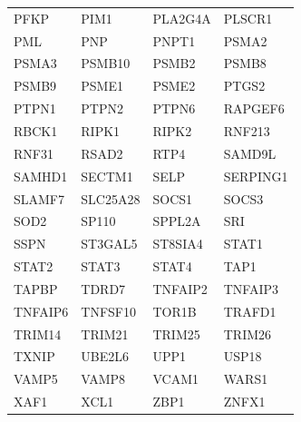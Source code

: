 \begin{longtable}{llll}
PFKP & PIM1 & PLA2G4A & PLSCR1 \\
PML & PNP & PNPT1 & PSMA2 \\
PSMA3 & PSMB10 & PSMB2 & PSMB8 \\
PSMB9 & PSME1 & PSME2 & PTGS2 \\
PTPN1 & PTPN2 & PTPN6 & RAPGEF6 \\
RBCK1 & RIPK1 & RIPK2 & RNF213 \\
RNF31 & RSAD2 & RTP4 & SAMD9L \\
SAMHD1 & SECTM1 & SELP & SERPING1 \\
SLAMF7 & SLC25A28 & SOCS1 & SOCS3 \\
SOD2 & SP110 & SPPL2A & SRI \\
SSPN & ST3GAL5 & ST8SIA4 & STAT1 \\
STAT2 & STAT3 & STAT4 & TAP1 \\
TAPBP & TDRD7 & TNFAIP2 & TNFAIP3 \\
TNFAIP6 & TNFSF10 & TOR1B & TRAFD1 \\
TRIM14 & TRIM21 & TRIM25 & TRIM26 \\
TXNIP & UBE2L6 & UPP1 & USP18 \\
VAMP5 & VAMP8 & VCAM1 & WARS1 \\
XAF1 & XCL1 & ZBP1 & ZNFX1 \\
\end{longtable}
